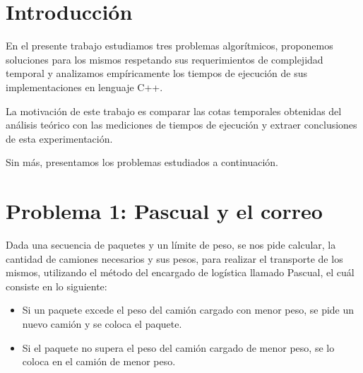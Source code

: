 \documentclass[a4paper,10pt,twoside]{article}
\begin{document}
\newpage




\tableofcontents

\newpage




\section{Introducción}

En el presente trabajo estudiamos tres problemas algorítmicos, proponemos soluciones para los mismos respetando sus requerimientos de complejidad temporal y analizamos empíricamente los tiempos de ejecución de sus implementaciones en lenguaje C++.

La motivación de este trabajo es comparar las cotas temporales obtenidas del análisis teórico con las mediciones de tiempos de ejecución y extraer conclusiones de esta experimentación.

Sin más, presentamos los problemas estudiados a continuación.




\section{Problema 1: Pascual y el correo}

Dada una secuencia de paquetes y un límite de peso, se nos pide calcular, la cantidad de camiones necesarios y sus pesos, para realizar el transporte de los mismos, utilizando el método del encargado de logística llamado Pascual, el cuál consiste en lo siguiente:

\begin{itemize}
\item Si un paquete excede el peso del camión cargado con menor peso, se pide un nuevo camión y se coloca el paquete.
\item Si el paquete no supera el peso del camión cargado de menor peso, se lo coloca en el camión de menor peso.
\end{itemize}
\end{document}
